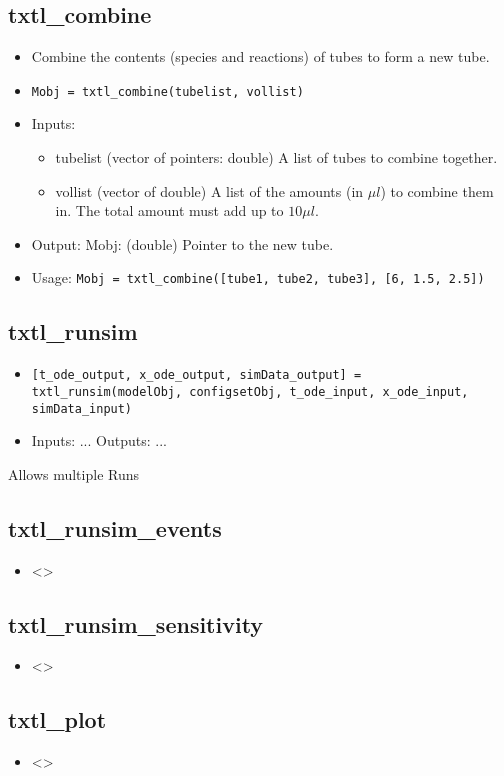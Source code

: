 \documentclass[english]{report}
\begin{document}
		\subsection*{txtl\_combine}
			\begin{itemize}
			\item Combine the contents (species and reactions) of tubes to form a new tube. 
			\item \texttt{Mobj = txtl\_combine(tubelist, vollist)}
			\item Inputs: 
			\begin{itemize}
			\item tubelist (vector of pointers: double) A list of tubes to combine together. 
			\item vollist (vector of double) A list of the amounts (in $\mu l$) to combine them in. The total amount must add up to $10 \mu l$.
			\end{itemize}
			\item Output: Mobj: (double) Pointer to the new tube. 
			\item Usage: \texttt{Mobj = txtl\_combine([tube1, tube2, tube3], [6, 1.5, 2.5])}
			\end{itemize}		
		\subsection*{txtl\_runsim}
			\begin{itemize}
			\item \texttt{[t\_ode\_output, x\_ode\_output, simData\_output] = txtl\_runsim(modelObj, configsetObj, t\_ode\_input, x\_ode\_input, simData\_input)}
			\item Inputs: ... Outputs: ...
			\end{itemize}		
		Allows multiple Runs
		\subsection*{txtl\_runsim\_events}
			\begin{itemize}
			\item <>
			\end{itemize}		
		\subsection*{txtl\_runsim\_sensitivity}
			\begin{itemize}
			\item <>
			\end{itemize}		
		\subsection*{txtl\_plot}
			\begin{itemize}
			\item <>
			\end{itemize}		
\end{document}
